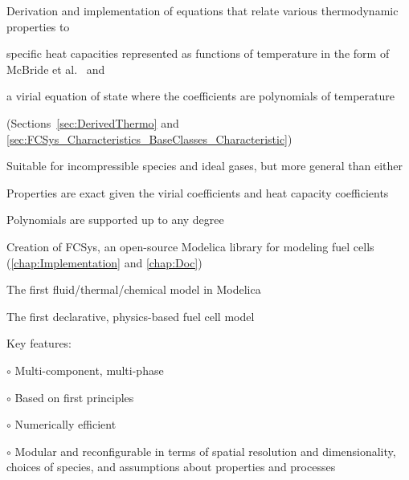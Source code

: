 \begin{itemize*}
  \item Derivation and implementation of equations that relate various thermodynamic properties to \begin{inparaenum}[(1)]\item specific heat capacities represented as functions of temperature in the form of McBride et al.~\cite{McBride2002} and \item a virial equation of state where the coefficients are polynomials of temperature\end{inparaenum} (Sections~\ref{sec:DerivedThermo} and \ref{sec:FCSys_Characteristics_BaseClasses_Characteristic})
    \begin{itemize*}
      \item Suitable for incompressible species and ideal gases, but more general than either
      \item Properties are exact given the virial coefficients and heat capacity coefficients
      \item Polynomials are supported up to any degree
    \end{itemize*}

  \item Creation of FCSys, an open-source Modelica library for modeling fuel cells (\autoref{chap:Implementation} and \autoref{chap:Doc})
    \begin{itemize*}
       \item The first  fluid/thermal/chemical model in Modelica
       \item The first declarative, physics-based fuel cell model
       \item Key features:
       \begin{itemize*}
          \item[$\circ$] Multi-component, multi-phase
          \item[$\circ$] Based on first principles
          \item[$\circ$] Numerically efficient
          \item[$\circ$] Modular and reconfigurable in terms of spatial resolution and dimensionality, choices of species, and assumptions about properties and processes
        \end{itemize*}%


\end{itemize*}
\end{itemize*}
